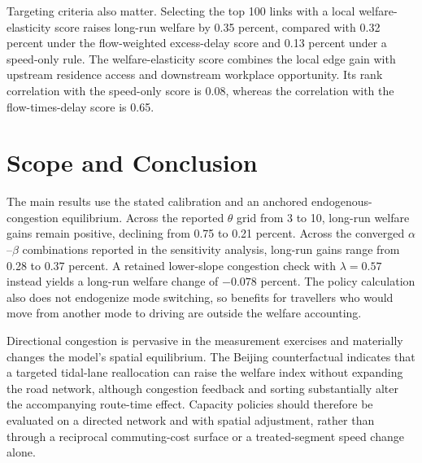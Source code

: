 \documentclass[12pt]{article}
\begin{document}
Targeting criteria also matter. Selecting the top 100 links with a local welfare-elasticity score raises long-run welfare by 0.35 percent, compared with 0.32 percent under the flow-weighted excess-delay score and 0.13 percent under a speed-only rule. The welfare-elasticity score combines the local edge gain with upstream residence access and downstream workplace opportunity. Its rank correlation with the speed-only score is 0.08, whereas the correlation with the flow-times-delay score is 0.65.

\section{Scope and Conclusion}

The main results use the stated calibration and an anchored endogenous-congestion equilibrium. Across the reported $\theta$ grid from 3 to 10, long-run welfare gains remain positive, declining from 0.75 to 0.21 percent. Across the converged $\alpha$--$\beta$ combinations reported in the sensitivity analysis, long-run gains range from 0.28 to 0.37 percent. A retained lower-slope congestion check with $\lambda=0.57$ instead yields a long-run welfare change of $-0.078$ percent. The policy calculation also does not endogenize mode switching, so benefits for travellers who would move from another mode to driving are outside the welfare accounting.

Directional congestion is pervasive in the measurement exercises and materially changes the model's spatial equilibrium. The Beijing counterfactual indicates that a targeted tidal-lane reallocation can raise the welfare index without expanding the road network, although congestion feedback and sorting substantially alter the accompanying route-time effect. Capacity policies should therefore be evaluated on a directed network and with spatial adjustment, rather than through a reciprocal commuting-cost surface or a treated-segment speed change alone.



\end{document}

